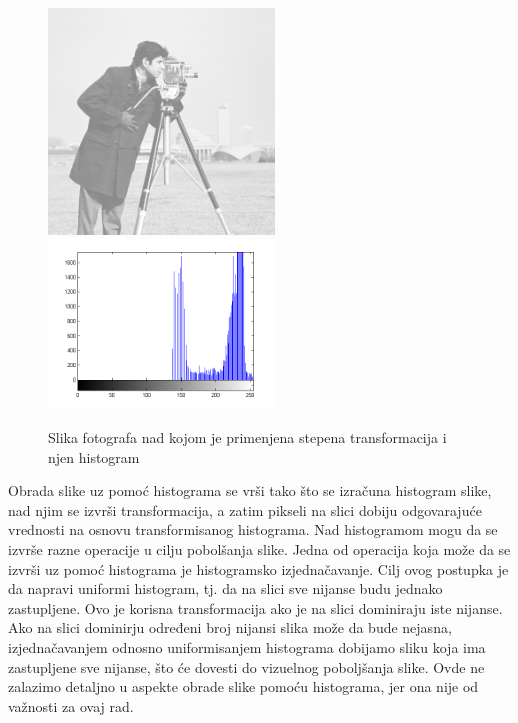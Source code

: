 \documentclass[a4paper,12pt,titlepage]{article}
\begin{document}
\begin{figure}[ht!]
\centering
\includegraphics[width=60mm]{img/imgPow2.png}
\includegraphics[width=60mm]{img/histImgPow2.png}
\caption{Slika fotografa nad kojom je primenjena stepena transformacija i njen histogram}
\label{overflow}
\end{figure} 

Obrada slike uz pomoć histograma se vrši tako što se izračuna histogram slike, nad njim se izvrši transformacija, a zatim pikseli na slici dobiju odgovarajuće vrednosti na osnovu transformisanog histograma. Nad histogramom mogu da se izvrše razne operacije u cilju pobolšanja slike.   
Jedna od operacija koja može da se izvrši uz pomoć histograma je histogramsko izjednačavanje. Cilj ovog postupka je da napravi uniformi histogram, tj. da na slici sve nijanse budu jednako zastupljene. Ovo je korisna transformacija ako je na slici dominiraju iste nijanse. Ako na slici dominirju određeni broj nijansi slika može da bude nejasna, izjednačavanjem odnosno uniformisanjem histograma dobijamo sliku koja ima zastupljene sve nijanse, što će dovesti do vizuelnog poboljšanja slike. Ovde ne zalazimo detaljno u aspekte obrade slike pomoću histograma, jer ona nije od važnosti za ovaj rad.
\end{document}
